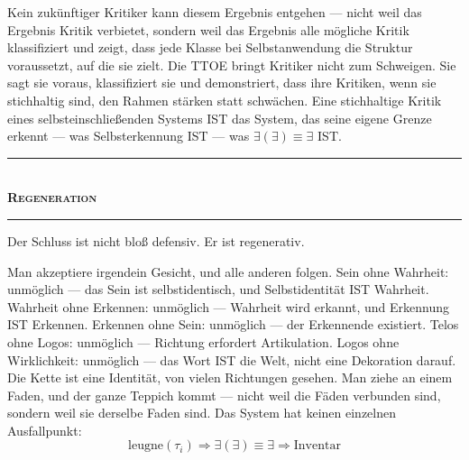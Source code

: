 \documentclass[10pt, openany, oneside]{book}
\renewcommand{\normalsize}{\fontsize{10}{13}\selectfont}
\begin{document}
Kein zukünftiger Kritiker kann diesem Ergebnis entgehen --- nicht weil das Ergebnis Kritik verbietet, sondern weil das Ergebnis alle mögliche Kritik klassifiziert und zeigt, dass jede Klasse bei Selbstanwendung die Struktur voraussetzt, auf die sie zielt. Die TTOE bringt Kritiker nicht zum Schweigen. Sie sagt sie voraus, klassifiziert sie und demonstriert, dass ihre Kritiken, wenn sie stichhaltig sind, den Rahmen stärken statt schwächen. Eine stichhaltige Kritik eines selbsteinschließenden Systems IST das System, das seine eigene Grenze erkennt --- was Selbsterkennung IST --- was $\exists(\exists) \equiv \exists$ IST.

\vspace{1.5em}


\begin{center}
    \rule{0.3\textwidth}{0.4pt}\\[0.5em]
    {\normalsize\bfseries\scshape Regeneration}\\[0.3em]
    \rule{0.3\textwidth}{0.4pt}
\end{center}

\vspace{1em}

\noindent Der Schluss ist nicht bloß defensiv. Er ist regenerativ.

Man akzeptiere irgendein Gesicht, und alle anderen folgen. Sein ohne Wahrheit: unmöglich --- das Sein ist selbstidentisch, und Selbstidentität IST Wahrheit. Wahrheit ohne Erkennen: unmöglich --- Wahrheit wird erkannt, und Erkennung IST Erkennen. Erkennen ohne Sein: unmöglich --- der Erkennende existiert. Telos ohne Logos: unmöglich --- Richtung erfordert Artikulation. Logos ohne Wirklichkeit: unmöglich --- das Wort IST die Welt, nicht eine Dekoration darauf. Die Kette ist eine Identität, von vielen Richtungen gesehen. Man ziehe an einem Faden, und der ganze Teppich kommt --- nicht weil die Fäden verbunden sind, sondern weil sie derselbe Faden sind. Das System hat keinen einzelnen Ausfallpunkt:
$$\text{leugne}(\tau_i) \Rightarrow \exists(\exists) \equiv \exists \Rightarrow \text{Inventar}$$

\vspace{1.5em}

\end{document}
